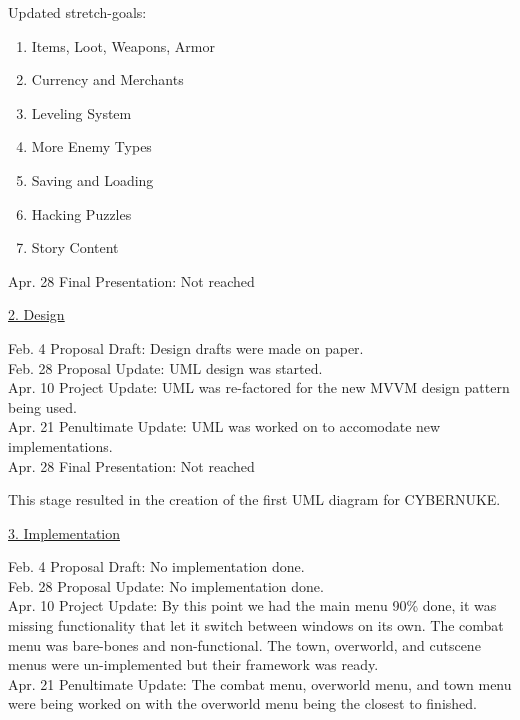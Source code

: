 \documentclass[10pt,conference,onecolumn,compsoc]{IEEEtran}
\begin{document}
Updated stretch-goals:
\begin{enumerate}
\item Items, Loot, Weapons, Armor
\item Currency and Merchants
\item Leveling System
\item More Enemy Types
\item Saving and Loading
\item Hacking Puzzles
\item Story Content\\
\end{enumerate}

Apr. 28 Final Presentation: Not reached

\vspace{5px}
\underline{2. Design}
\vspace{5px}

Feb. 4 Proposal Draft: Design drafts were made on paper.\\

Feb. 28 Proposal Update: UML design was started.\\

Apr. 10 Project Update: UML was re-factored for the new MVVM design pattern being used.\\

Apr. 21 Penultimate Update: UML was worked on to accomodate new implementations.\\

Apr. 28 Final Presentation: Not reached


This stage resulted in the creation of the first UML diagram for CYBERNUKE.

\vspace{5px}
\underline{3. Implementation}
\vspace{5px}

Feb. 4 Proposal Draft: No implementation done.\\

Feb. 28 Proposal Update: No implementation done.\\

Apr. 10 Project Update: By this point we had the main menu 90\% done, it was missing functionality that let it switch between windows on its own. The combat menu was bare-bones and non-functional. The town, overworld, and cutscene menus were un-implemented but their framework was ready.\\

Apr. 21 Penultimate Update: The combat menu, overworld menu, and town menu were being worked on with the overworld menu being the closest to finished.\\
\end{document}
